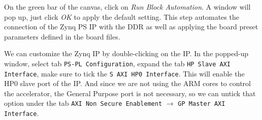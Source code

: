 \documentclass[11pt]{article}
\begin{document}
\begin{appendices}
On the green bar of the canvas, click on \emph{Run Block Automation}. A window will pop up, just click \emph{OK} to apply the default setting. This step automates the connection of the Zynq PS IP with the DDR as well as applying the board preset parameters defined in the board files.

\begin{center}
\end{center}

We can customize the Zynq IP by double-clicking on the IP. In the popped-up window, select tab \texttt{PS-PL Configuration}, expand the tab \texttt{HP Slave AXI Interface}, make sure to tick the \texttt{S AXI HP0 Interface}. This will enable the HP0 slave port of the IP. And since we are not using the ARM cores to control the accelerator, the General Purpose port is not necessary, so we can untick that option under the tab \texttt{AXI Non Secure Enablement} $\rightarrow$ \texttt{GP Master AXI Interface}.

\begin{center}
\end{center}


\end{appendices}
\end{document}
